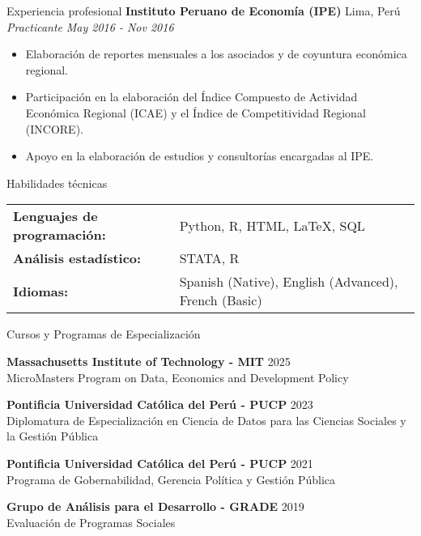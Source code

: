 \documentclass{resume} %
\begin{document}
\begin{rSection}{Experiencia profesional}
    \textbf{Instituto Peruano de Economía (IPE)} \hfill Lima, Perú\\
    \textit{Practicante} \hfill \textit{May 2016 - Nov 2016}
    \begin{itemize}
        \itemsep -3pt {} 
        \item Elaboración de reportes mensuales a los asociados y de coyuntura económica regional. 
        \item Participación en la elaboración del Índice Compuesto de Actividad Económica Regional (ICAE) y el Índice de Competitividad Regional (INCORE). 
        \item Apoyo en la elaboración de estudios y consultorías encargadas al IPE.
    \end{itemize}
\end{rSection} 

\begin{rSection}{Habilidades técnicas}
    \begin{tabular}{@{} l l @{}}
    \textbf{Lenguajes de programación:} & Python, R, HTML, \LaTeX, SQL\\
    \textbf{Análisis estadístico:} & STATA, R \\
    \textbf{Idiomas:} & Spanish (Native), English (Advanced), French (Basic)
    \end{tabular}
    \end{rSection}


\begin{rSection}{Cursos y Programas de Especialización}

{\bf Massachusetts Institute of Technology - MIT} \hfill {2025} \\
MicroMasters Program on Data, Economics and Development Policy

{\bf Pontificia Universidad Católica del Perú - PUCP} \hfill {2023}\\
Diplomatura de Especialización en Ciencia de Datos para las Ciencias Sociales y la Gestión Pública

{\bf Pontificia Universidad Católica del Perú - PUCP} \hfill {2021}\\
Programa de Gobernabilidad, Gerencia Política y Gestión Pública

{\bf Grupo de Análisis para el Desarrollo - GRADE} \hfill {2019}\\
Evaluación de Programas Sociales

\end{rSection}
\end{document}
